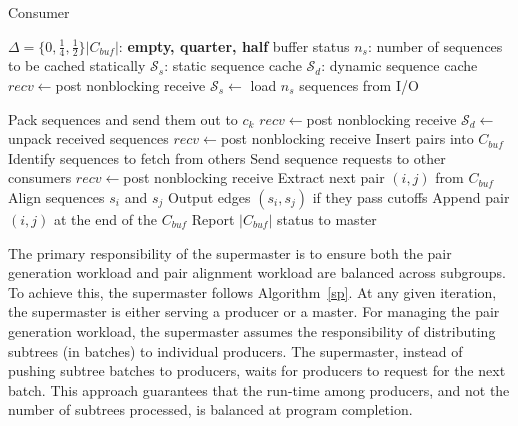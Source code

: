 \documentclass[10pt,journal,letterpaper,compsoc]{IEEEtran}
\begin{document}
\begin{algorithm}
\caption{Consumer}
\label{cs}
\begin{algorithmic}[1]
    \STATE $\Delta=\{0, \frac{1}{4}, \frac{1}{2}\}|C_{buf}|$: {\bf empty, quarter, half} buffer status
    \STATE $n_{s}$: number of sequences to be cached statically
    \STATE $\mathcal{S}_{s}$: static sequence cache
    \STATE $ \mathcal{S}_{d}$: dynamic sequence cache
    \STATE $recv\leftarrow$post nonblocking receive
    \STATE $\mathcal{S}_{s}\leftarrow$ load $n_{s}$ sequences from I/O
    
    \WHILE {\TRUE}
			\STATE Pack sequences and send them out to $c_{k}$
			\STATE $recv\leftarrow$post nonblocking receive
			\STATE  $\mathcal{S}_{d}\leftarrow$ unpack received sequences
			\STATE $recv\leftarrow$post nonblocking receive
		        \STATE Insert pairs into $C_{buf}$
			\STATE Identify sequences to fetch from others
			\STATE Send sequence requests to other consumers
			\STATE $recv\leftarrow$post nonblocking receive
	        \ENDIF
	    \ELSE
	    		\STATE Extract next pair $(i, j)$ from $C_{buf}$
				\STATE Align sequences $s_{i}$ and $s_{j}$
				\STATE Output edges $(s_{i},s_{j})$ if they pass cutoffs
			\ELSE
				\STATE Append pair $(i, j)$ at the end of the $C_{buf}$
			\ENDIF
				\STATE Report $|C_{buf}|$ status to master
			\ENDIF
		\ENDIF
            \ENDIF
    \ENDWHILE
\end{algorithmic}
\end{algorithm}





The primary responsibility of the supermaster is to ensure both the pair generation workload and pair alignment workload are balanced across subgroups. To achieve this, the supermaster follows Algorithm~\ref{sp}. At any given iteration, the supermaster is either serving a producer or a master. For managing the pair generation workload, the supermaster assumes the responsibility of distributing subtrees (in batches) to individual producers. The supermaster, instead of pushing subtree batches to producers, waits for producers to request for the next batch. This approach guarantees that the run-time among producers, and not the number of subtrees processed, is balanced at program completion. 
\end{document}
